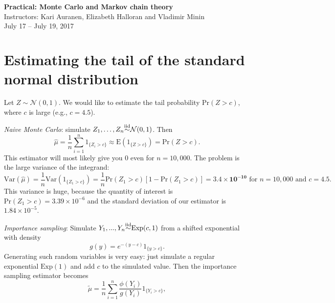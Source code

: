 \documentclass[11pt]{article}
\numberwithin{algorithm}{section}
\newcommand{\indfun}[1]{\ensuremath{1_{\{#1\}}}}
\theoremstyle{remark}
\theoremstyle{definition}
\numberwithin{equation}{section}
\numberwithin{figure}{section}
\begin{document}


\begin{center}
  \textbf{\Large Practical: Monte Carlo and Markov chain theory}\\
  {\large Instructors: Kari Auranen, Elizabeth Halloran and Vladimir Minin}\\
  {\large July 17 -- July 19, 2017}
\end{center}


\section*{Estimating the tail of the standard normal distribution}
  Let $Z \sim \mathcal{N}(0,1)$. We would like to estimate the tail probability 
  $\text{Pr}(Z > c)$, where $c$ is large (e.g., $c = 4.5$).  
  \par
  \textit{Naive Monte Carlo}: simulate $Z_1,\dots,Z_n {\buildrel \text{iid} \over \sim} \mathcal{N}(0,1)$.
  Then 
  \begin{equation*}
    \hat{\mu} = \frac{1}{n} \sum_{i=1}^n 1_{\{Z_i>c\}} \approx 
   \text{E}\left(1_{\{Z>c\}}\right) = \text{Pr}(Z>c). 
  \end{equation*}
  This estimator will most likely give you 0 even for $n = 10,000$.  
  The problem is the large variance of the integrand:
  \begin{equation*}
    \text{Var}(\hat{\mu}) = \frac{1}{n}\text{Var}(\indfun{Z_1 > c}) 
    = \frac{1}{n}\text{Pr}(Z_1 > c)[1 - \text{Pr}(Z_1 > c)] = \mathbf{3.4\times10^{-10}} \text{ for } n=10,000 
    \text{ and } c=4.5. 
  \end{equation*}
  This variance is huge, because the quantity of interest is $\text{Pr}(Z_1 > c) = 3.39\times 10^{-6}$ and the standard
  deviation of our estimator is $1.84\times10^{-5}$.
  \par
  \textit{Importance sampling}: Simulate $Y_1,...,Y_n {\buildrel \text{iid} \over \sim} \text{Exp}(c, 1)$ 
  from a shifted exponential with density
  \begin{equation*}
    g(y) = e^{-(y-c)}1_{\{y > c\}}.
  \end{equation*}
  Generating such random variables is very easy: just simulate a regular exponential $\text{Exp}(1)$ and
  add $c$ to the simulated value. Then the importance sampling estimator becomes
  \begin{equation*}
    \tilde{\mu} = \frac{1}{n} \sum_{i=1}^n \frac{\phi(Y_i)}{g(Y_i)} \indfun{Y_i > c},
  \end{equation*}
\end{document}
